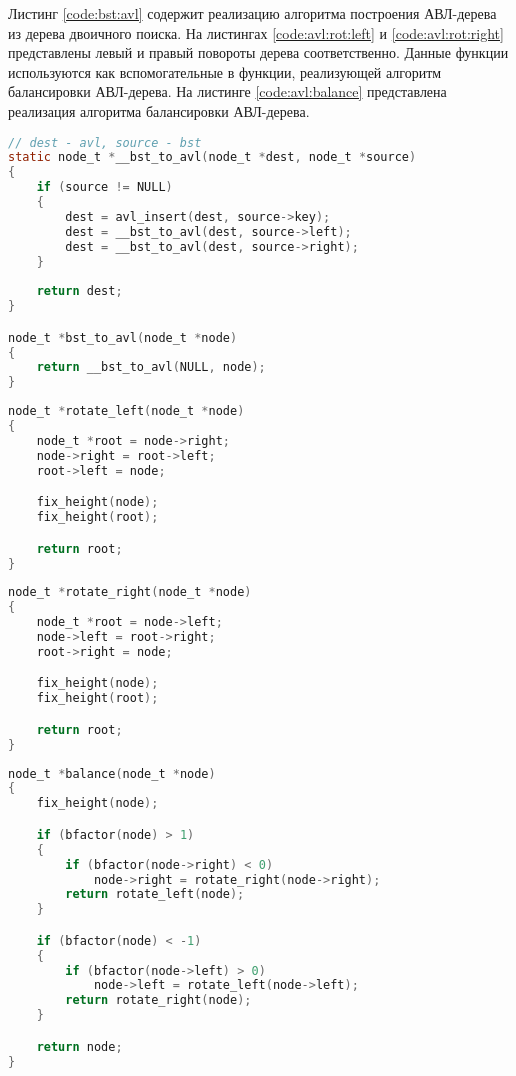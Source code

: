 Листинг \ref{code:bst:avl} содержит реализацию алгоритма построения АВЛ-дерева из дерева двоичного поиска.
На листингах \ref{code:avl:rot:left} и \ref{code:avl:rot:right} представлены левый и правый повороты дерева соответственно.
Данные функции используются как вспомогательные в функции, реализующей алгоритм балансировки АВЛ-дерева.
На листинге \ref{code:avl:balance} представлена реализация алгоритма балансировки АВЛ-дерева.

\begin{lstlisting}[language=C,caption=Реализация алгоритма построения АВЛ-дерева из дерева двоичного поиска,label=code:bst:avl]
// dest - avl, source - bst
static node_t *__bst_to_avl(node_t *dest, node_t *source)
{
    if (source != NULL)
    {
        dest = avl_insert(dest, source->key);
        dest = __bst_to_avl(dest, source->left);
        dest = __bst_to_avl(dest, source->right);
    }
    
    return dest;
}

node_t *bst_to_avl(node_t *node)
{
    return __bst_to_avl(NULL, node);
}
\end{lstlisting}

\begin{lstlisting}[language=C,caption=Реализация алгоритма поворота дерева влево,label=code:avl:rot:left]
node_t *rotate_left(node_t *node)
{
    node_t *root = node->right;
    node->right = root->left;
    root->left = node;

    fix_height(node);
    fix_height(root);

    return root;
}
\end{lstlisting}

\clearpage

\begin{lstlisting}[language=C,caption=Реализация алгоритма поворота дерева вправо,label=code:avl:rot:right]
node_t *rotate_right(node_t *node)
{
    node_t *root = node->left;
    node->left = root->right;
    root->right = node;

    fix_height(node);
    fix_height(root);

    return root;
}    
\end{lstlisting}

\begin{lstlisting}[language=C,caption=Реализация алгоритма балансировки АВЛ-дерева,label=code:avl:balance]
node_t *balance(node_t *node)
{
    fix_height(node);

    if (bfactor(node) > 1)
    {
        if (bfactor(node->right) < 0)
            node->right = rotate_right(node->right);
        return rotate_left(node);
    }

    if (bfactor(node) < -1)
    {
        if (bfactor(node->left) > 0)
            node->left = rotate_left(node->left);
        return rotate_right(node);
    }

    return node;
}
\end{lstlisting}

